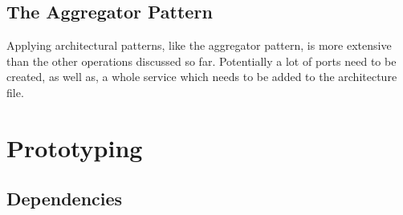 \subsection{The Aggregator Pattern}
Applying architectural patterns, like the aggregator pattern, is more extensive than the other operations discussed so far.
Potentially a lot of ports need to be created, as well as, a whole service which needs to be added to the architecture file.


\section{Prototyping}
\subsection{Dependencies}
\clearpage